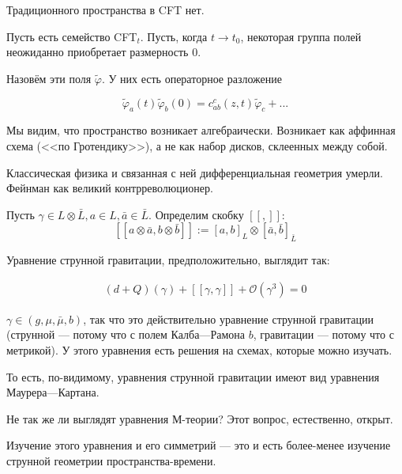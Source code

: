 \documentclass[11pt]{article}
\def\be{\numberwithin{equation}{section}\begin{eqnarray}}
\def\ee{\end{eqnarray}}
\def\ph{\varphi}
\theoremstyle{remark}
\theoremstyle{definition}
\begin{document}
Традиционного пространства в CFT нет.

Пусть есть семейство CFT$_t$. Пусть, когда $t \to t_0$, некоторая группа полей неожиданно приобретает размерность 0.

Назовём эти поля $\tilde \ph$. У них есть операторное разложение

$$\tilde \ph_a (t) \tilde \ph_b (0) = c_{ab}^c (z,t) \tilde \ph_c + ...$$

Мы видим, что пространство возникает алгебраически. Возникает как аффинная схема (<<по Гротендику>>), а не как набор дисков, склеенных между собой.


Классическая физика и связанная с ней дифференциальная геометрия умерли. Фейнман как великий контрреволюционер.

Пусть $\gamma \in L \otimes \bar L, a \in L, \bar a \in \bar L$. Определим скобку $[[,]]$: $$[[a \otimes \bar a, b \otimes \bar b]] := [a, b]_L \otimes [\bar a, \bar b]_{\bar L}$$

Уравнение струнной гравитации, предположительно, выглядит так:

\be (d+Q) (\gamma) + [[\gamma, \gamma]] + \mathcal{O}(\gamma^3) = 0 \ee

$\gamma \in (g, \mu, \bar \mu, b)$, так что это действительно уравнение струнной гравитации (струнной --- потому что с полем Калба---Рамона $b$, гравитации --- потому что с метрикой). У этого уравнения есть решения на схемах, которые можно изучать.

То есть, по-видимому, уравнения струнной гравитации имеют вид уравнения Маурера---Картана.

Не так же ли выглядят уравнения М-теории? Этот вопрос, естественно, открыт.

Изучение этого уравнения и его симметрий --- это и есть более-менее изучение струнной геометрии пространства-времени.


\bigskip
\bigskip


 
\end{document}
